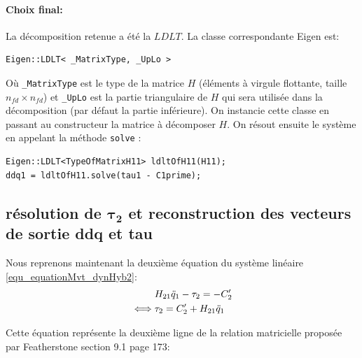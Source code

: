 \documentclass{report}
\begin{document}
\paragraph{Choix final:} La décomposition retenue a été la $LDLT$. La classe correspondante Eigen est:
\begin{verbatim}
Eigen::LDLT< _MatrixType, _UpLo >
\end{verbatim}
Où \verb;_MatrixType; est le type de la matrice $H$ (éléments à virgule flottante, taille $n_{fd} \times n_{fd}$) et \verb;_UpLo; est la partie triangulaire de $H$ qui sera utilisée dans la décomposition (par défaut la partie inférieure). On instancie cette classe en passant au constructeur la matrice à décomposer $H$. On résout ensuite le système en appelant la méthode \verb;solve; :
\begin{verbatim}
Eigen::LDLT<TypeOfMatrixH11> ldltOfH11(H11);
ddq1 = ldltOfH11.solve(tau1 - C1prime);
\end{verbatim}


\subsection{résolution de $\mathbf{\tau_2}$ et reconstruction des vecteurs de sortie ddq et tau} \label{ch_impl_calculTau2}

Nous reprenons maintenant la deuxième équation du système linéaire \eqref{equ_equationMvt_dynHyb2}:
\begin{align}
&H_{21} \ddot{q}_1 - \tau_2 = -C'_2 \notag \\
\iff
&\tau_2 = C'_2 + H_{21} \ddot{q}_1 \label{equ_tau}
\end{align}

Cette équation représente la deuxième ligne de la relation matricielle proposée par Featherstone \cite{bib_featherstone} section 9.1 page 173:
\end{document}
